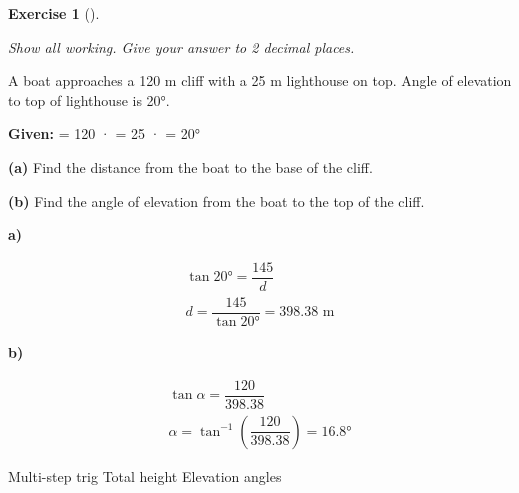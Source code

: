 \documentclass[
  letterpaper,
  DIV=11,
  numbers=noendperiod]{scrreprt}
\theoremstyle{definition}
\newtheorem{exercise}{Exercise}[chapter]
\theoremstyle{remark}
\begin{document}
\begin{exercise}[]\protect\hypertarget{exr-trig-30}{}\label{exr-trig-30}

\emph{Show all working. Give your answer to 2 decimal places.}

A boat approaches a 120 m cliff with a 25 m lighthouse on top. Angle of
elevation to top of lighthouse is 20°.

\textbf{Given:}  = 120 ·  =
25 ·  = 20°

\textbf{(a)} Find the distance from the boat to the base of the cliff.

\textbf{(b)} Find the angle of elevation from the boat to the top of the
cliff.

\begin{tcolorbox}[enhanced jigsaw, opacitybacktitle=0.6, coltitle=black, arc=.35mm, colframe=quarto-callout-tip-color-frame, colback=white, bottomrule=.15mm, left=2mm, colbacktitle=quarto-callout-tip-color!10!white, titlerule=0mm, opacityback=0, title=\textcolor{quarto-callout-tip-color}{\faLightbulb}\hspace{0.5em}{🔍 View Solution}, leftrule=.75mm, breakable, rightrule=.15mm, bottomtitle=1mm, toptitle=1mm, toprule=.15mm]

\textbf{a)}

\[
\begin{aligned}
\tan 20° = \dfrac{145}{d} \\ d = \dfrac{145}{\tan 20°} = 398.38 \text{ m}
\end{aligned}
\]

\textbf{b)}

\[
\begin{aligned}
\tan\alpha = \dfrac{120}{398.38} \\ \alpha = \tan^{-1}\!\left(\dfrac{120}{398.38}\right) = 16.8°
\end{aligned}
\]

\end{tcolorbox}

{Multi-step trig} {Total height} {Elevation angles}

\end{exercise}
\end{document}
